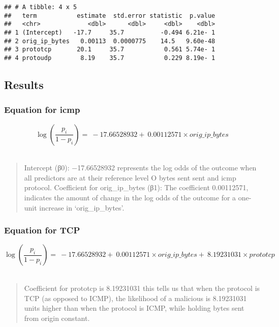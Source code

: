\documentclass[
]{article}
\begin{document}
\begin{verbatim}
## # A tibble: 4 x 5
##   term           estimate  std.error statistic  p.value
##   <chr>             <dbl>      <dbl>     <dbl>    <dbl>
## 1 (Intercept)   -17.7     35.7          -0.494 6.21e- 1
## 2 orig_ip_bytes   0.00113  0.0000775    14.5   9.60e-48
## 3 prototcp       20.1     35.7           0.561 5.74e- 1
## 4 protoudp        8.19    35.7           0.229 8.19e- 1
\end{verbatim}

\hypertarget{results}{%
\subsection{Results}\label{results}}

\hypertarget{equation-for-icmp}{%
\subsubsection{Equation for icmp}\label{equation-for-icmp}}

\[
\begin{equation*}
\log\left(\frac{p_i}{1-p_i}\right) = \ -17.66528932 + \ 0.00112571 \times orig\_ip\_bytes 
\end{equation*}
\]\\

\begin{quote}
Intercept (β0): −17.66528932 represents the log odds of the outcome when
all predictors are at their reference level O bytes sent sent and icmp
protocol. Coefficient for orig\_ip\_bytes (β1): The coefficient
0.00112571, indicates the amount of change in the log odds of the
outcome for a one-unit increase in `orig\_ip\_bytes'.
\end{quote}

\hypertarget{equation-for-tcp}{%
\subsubsection{Equation for TCP}\label{equation-for-tcp}}

\[
\begin{equation*}
\log\left(\frac{p_i}{1-p_i}\right) = \ -17.66528932 + \ 0.00112571 \times orig\_ip\_bytes + \ 8.19231031 \times prototcp
\end{equation*}
\]\\

\begin{quote}
Coefficient for prototcp is 8.19231031 this tells us that when the
protocol is TCP (as opposed to ICMP), the likelihood of a malicious is
8.19231031 units higher than when the protocol is ICMP, while holding
bytes sent from origin constant.
\end{quote}
\end{document}
